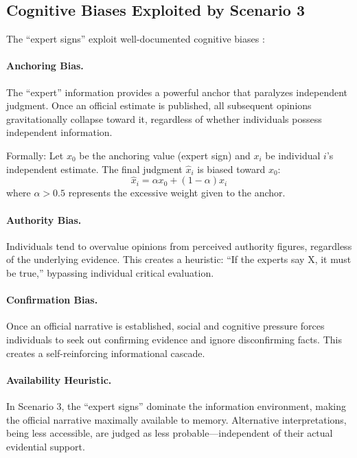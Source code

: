 \documentclass[11pt,a4paper]{article}
\begin{document}
\begin{small}
\subsection{Cognitive Biases Exploited by Scenario 3}

The ``expert signs'' exploit well-documented cognitive biases \citep{Kahneman2011}:

\paragraph{Anchoring Bias.} The ``expert'' information provides a powerful anchor that paralyzes independent judgment. Once an official estimate is published, all subsequent opinions gravitationally collapse toward it, regardless of whether individuals possess independent information.

Formally: Let $x_0$ be the anchoring value (expert sign) and $x_i$ be individual $i$'s independent estimate. The final judgment $\hat{x}_i$ is biased toward $x_0$:
\begin{equation}
\hat{x}_i = \alpha x_0 + (1-\alpha) x_i
\end{equation}
where $\alpha > 0.5$ represents the excessive weight given to the anchor.

\paragraph{Authority Bias.} Individuals tend to overvalue opinions from perceived authority figures, regardless of the underlying evidence. This creates a heuristic: ``If the experts say X, it must be true,'' bypassing individual critical evaluation.

\paragraph{Confirmation Bias.} Once an official narrative is established, social and cognitive pressure forces individuals to seek out confirming evidence and ignore disconfirming facts. This creates a self-reinforcing informational cascade.

\paragraph{Availability Heuristic.} In Scenario 3, the ``expert signs'' dominate the information environment, making the official narrative maximally available to memory. Alternative interpretations, being less accessible, are judged as less probable---independent of their actual evidential support.


\end{small}
\end{document}
